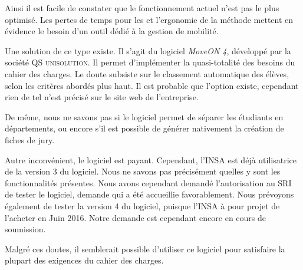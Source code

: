 \bigbreak 

Ainsi il est facile de constater que le fonctionnement actuel n'est pas le plus optimisé. Les pertes de temps pour les \ris et l'ergonomie de la méthode mettent en évidence le besoin d'un outil dédié à la gestion de mobilité. 

Une solution de ce type existe. Il s'agit du logiciel \textit{MoveON 4}, développé par la société \textsc{QS unisolution}. Il permet d'implémenter la quasi-totalité des besoins du cahier des charges. Le doute subsiste sur le classement automatique des élèves, selon les critères abordés plus haut. Il est probable que l'option existe, cependant rien de tel n'est précisé sur le site web de l'entreprise. 

De même, nous ne savons pas si le logiciel permet de séparer les étudiants en départements, ou encore s'il est possible de générer nativement la création de fiches de jury. 

Autre inconvénient, le logiciel est payant. Cependant, l'INSA est déjà utilisatrice de la version 3 du logiciel. 
Nous ne savons pas précisément quelles y sont les fonctionnalités présentes. Nous avons cependant demandé l'autorisation au SRI de tester le logiciel, demande qui a été accueillie favorablement. Nous prévoyons également de tester la version 4 du logiciel, puisque l'INSA à pour projet de l'acheter en Juin 2016. Notre demande est cependant encore en cours de soumission. 


Malgré ces doutes, il semblerait possible d'utiliser ce logiciel pour satisfaire la plupart des exigences du cahier des charges. 
